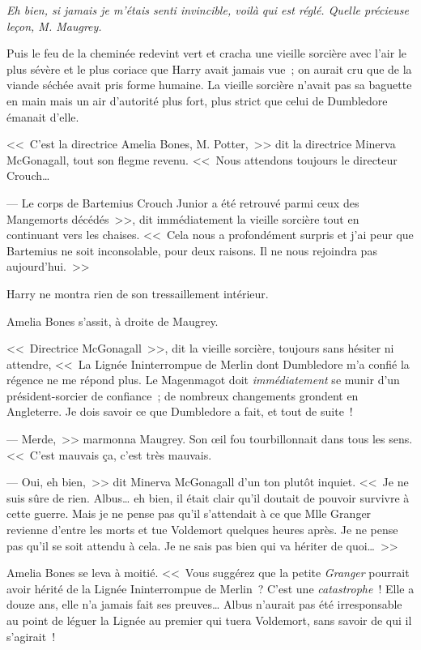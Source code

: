 \emph{Eh bien, si jamais je m'étais senti invincible, voilà qui est réglé. Quelle précieuse leçon, M. Maugrey.}

Puis le feu de la cheminée redevint vert et cracha une vieille sorcière avec l'air le plus sévère et le plus coriace que Harry avait jamais vue~; on aurait cru que de la viande séchée avait pris forme humaine. La vieille sorcière n'avait pas sa baguette en main mais un air d'autorité plus fort, plus strict que celui de Dumbledore émanait d'elle.

<<~C'est la directrice Amelia Bones, M. Potter,~>> dit la directrice Minerva McGonagall, tout son flegme revenu. <<~Nous attendons toujours le directeur Crouch…

--- Le corps de Bartemius Crouch Junior a été retrouvé parmi ceux des Mangemorts décédés~>>, dit immédiatement la vieille sorcière tout en continuant vers les chaises. <<~Cela nous a profondément surpris et j'ai peur que Bartemius ne soit inconsolable, pour deux raisons. Il ne nous rejoindra pas aujourd'hui.~>>

Harry ne montra rien de son tressaillement intérieur.

Amelia Bones s'assit, à droite de Maugrey.

<<~Directrice McGonagall~>>, dit la vieille sorcière, toujours sans hésiter ni attendre, <<~La Lignée Ininterrompue de Merlin dont Dumbledore m'a confié la régence ne me répond plus. Le Magenmagot doit \emph{immédiatement} se munir d'un président-sorcier de confiance~; de nombreux changements grondent en Angleterre. Je dois savoir ce que Dumbledore a fait, et tout de suite~!

--- Merde,~>> marmonna Maugrey. Son œil fou tourbillonnait dans tous les sens. <<~C'est mauvais ça, c'est très mauvais.

--- Oui, eh bien,~>> dit Minerva McGonagall d'un ton plutôt inquiet. <<~Je ne suis sûre de rien. Albus… eh bien, il était clair qu'il doutait de pouvoir survivre à cette guerre. Mais je ne pense pas qu'il s'attendait à ce que Mlle Granger revienne d'entre les morts et tue Voldemort quelques heures après. Je ne pense pas qu'il se soit attendu à cela. Je ne sais pas bien qui va hériter de quoi…~>>

Amelia Bones se leva à moitié. <<~Vous suggérez que la petite \emph{Granger} pourrait avoir hérité de la Lignée Ininterrompue de Merlin~? C'est une \emph{catastrophe}~! Elle a douze ans, elle n'a jamais fait ses preuves… Albus n'aurait pas été irresponsable au point de léguer la Lignée au premier qui tuera Voldemort, sans savoir de qui il s'agirait~!

